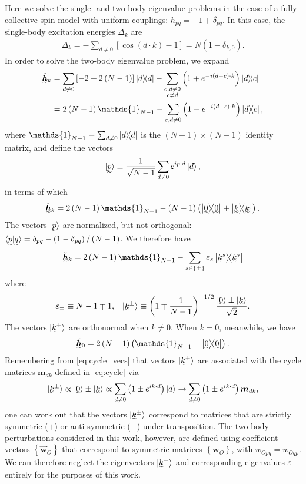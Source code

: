 \documentclass[nofootinbib,notitlepage,11pt]{revtex4-2}
\newcommand{\f}[2]{\dfrac{#1}{#2}} %
\newcommand{\p}[1]{\left(#1\right)} %
\renewcommand{\sp}[1]{\left[#1\right]} %
\renewcommand{\set}[1]{\left\{#1\right\}} %
\renewcommand{\c}{\cdot} %
\newcommand{\m}{\bm} %
\renewcommand{\v}{\vec} %
\newcommand{\1}{\mathds{1}}
\newcommand{\ut}{\undertilde}
\begin{document}
Here we solve the single- and two-body eigenvalue problems in the case
of a fully collective spin model with uniform couplings:
$h_{pq}=-1+\delta_{pq}$.  In this case, the single-body excitation
energies $\Delta_k$ are
\begin{align}
  \Delta_k
  = - \sum_{d\ne 0} \sp{\cos\p{d\c k}-1}
  = N \p{1-\delta_{k,0}}.
\end{align}
In order to solve the two-body eigenvalue problem, we expand
\begin{align}
  \ut{\check{\m h}}_k
  &= \sum_{d\ne0} \sp{-2+2\p{N-1}} \op{d}
  - \sum_{\substack{c,d\ne0\\c\ne d}} \p{1+e^{-i\p{d-c}\c k}} \op{d}{c} \\
  &= 2\p{N-1} \1_{N-1}
  - \sum_{c,d\ne0} \p{1+e^{-i\p{d-c}\c k}} \op{d}{c},
\end{align}
where $\1_{N-1}\equiv\sum_{d\ne0}\op{d}$ is the $\p{N-1}\times\p{N-1}$
identity matrix, and define the vectors
\begin{align}
  \ket{\ut{p}}
  \equiv \f1{\sqrt{N-1}} \sum_{d\ne 0} e^{i p\c d}\ket{d},
\end{align}
in terms of which
\begin{align}
  \ut{\check{\m h}}_k
  = 2\p{N-1} \1_{N-1} -\p{N-1} \p{\op{\ut{0}} + \op{\ut{k}}}.
\end{align}
The vectors $\ket{\ut{p}}$ are normalized, but not orthogonal:
$\braket{\ut{p}|\ut{q}}=\delta_{pq}-\p{1-\delta_{pq}}/\p{N-1}$.  We
therefore have
\begin{align}
  \ut{\check{\m h}}_k
  = 2\p{N-1} \1_{N-1} - \sum_{s\in\set{\pm}} \varepsilon_s \op{\ut{k}^s}
\end{align}
where
\begin{align}
  \varepsilon_\pm \equiv N - 1 \mp 1,
  &&
  \ket{\ut{k}^\pm}
  \equiv \p{1\mp\f1{N-1}}^{-1/2}
  \f{\ket{\ut{0}}\pm\ket{\ut{k}}}{\sqrt{2}}.
\end{align}
The vectors $\ket{\ut{k}^\pm}$ are orthonormal when $k\ne0$.  When
$k=0$, meanwhile, we have
\begin{align}
  \ut{\check{\m h}}_0 = 2\p{N-1} \p{\1_{N-1} - \op{\ut{0}}}.
\end{align}
Remembering from \eqref{eq:cycle_vecs} that vectors $\ket{\ut{k}^\pm}$
are associated with the cycle matrices $\m m_{dk}$ defined in
\eqref{eq:cycle} via
\begin{align}
  \ket{\ut{k}^\pm}
  \propto \ket{\ut{0}} \pm \ket{\ut{k}}
  \propto \sum_{d\ne0} \p{1 \pm e^{ik\c d}} \ket{d}
  \to \sum_{d\ne0} \p{1 \pm e^{ik\c d}} \m m_{dk},
\end{align}
one can work out that the vectors $\ket{\ut{k}^\pm}$ correspond to
matrices that are strictly symmetric ($+$) or anti-symmetric ($-$)
under transposition.  The two-body perturbations considered in this
work, however, are defined using coefficient vectors
$\set{\v{\m w}_O}$ that correspond to symmetric matrices
$\set{\m w_O}$, with $w_{Opq}=w_{Oqp}$.  We can therefore neglect the
eigenvectors $\ket{\ut{k}^-}$ and corresponding eigenvalues
$\varepsilon_-$ entirely for the purposes of this work.
\end{document}
